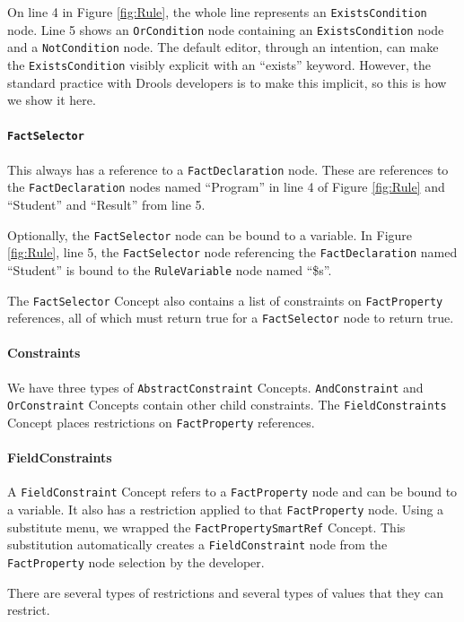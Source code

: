 On line 4 in Figure \ref{fig:Rule}, the whole line represents an \texttt{ExistsCondition} node.
Line 5 shows an \texttt{OrCondition} node containing an \texttt{ExistsCondition} node and a \texttt{NotCondition} node.
The default editor, through an intention, can make the \texttt{ExistsCondition} visibly explicit with an ``exists'' keyword.
However, the standard practice with Drools developers is to make this implicit, so this is how we show it here.

\paragraph{\texttt{FactSelector}} This always has a reference to a \texttt{FactDeclaration} node.
These are references to the \texttt{FactDeclaration} nodes named ``Program'' in line 4 of Figure \ref{fig:Rule} and ``Student'' and ``Result'' from line 5.

Optionally, the \texttt{FactSelector} node can be bound to a variable.
In Figure \ref{fig:Rule}, line 5, the \texttt{FactSelector} node referencing the \texttt{FactDeclaration} named ``Student'' is bound to the \texttt{RuleVariable} node named ``\$s''.

The \texttt{FactSelector} Concept also contains a list of constraints on \texttt{FactProperty} references, all of which must return true for a \texttt{FactSelector} node to return true.

\paragraph{Constraints} We have three types of \texttt{AbstractConstraint} Concepts.
\texttt{AndConstraint} and \texttt{OrConstraint} Concepts contain other child constraints.
The \texttt{FieldConstraints} Concept places restrictions on \texttt{FactProperty} references.

\paragraph{FieldConstraints} A \texttt{FieldConstraint} Concept refers to a \texttt{FactProperty} node and can be bound to a variable.
It also has a restriction applied to that \texttt{FactProperty} node.
Using a substitute menu, we wrapped the \texttt{FactPropertySmartRef} Concept.
This substitution automatically creates a \texttt{FieldConstraint} node from the \texttt{FactProperty} node selection by the developer.

There are several types of restrictions and several types of values that they can restrict.

